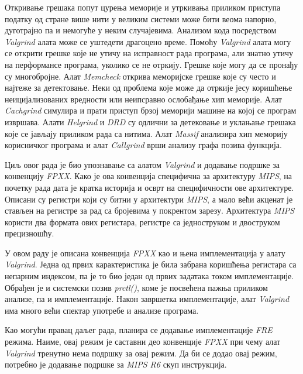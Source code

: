\documentclass[12pt,oneside]{memoir}
\begin{document}
\indent Откривање грешака попут цурења меморије и утркивања приликом приступа податку од стране више нити у великим системи може бити веома напорно, дуготрајно па и немогуће у неким случајевима. Анализом кода посредством \textit{Valgrind} алата може се уштедети драгоцено време. Помоћу \textit{Valgrind} алата могу се открити грешке које не утичу на исправност рада програма, али знатно утичу на перформансе програма, уколико се не отркију. Грешке које могу да се пронађу су многобројне. Алат \textit{Memcheck} открива меморијске грешке које су често и најтеже за детектовање. Неки од проблема које може да отркије јесу коришћење неицијализованих вредности или неипсравно ослобађање хип меморије. Алат \textit{Cachgrind} симулира и прати приступ брзој меморији машине на којој се програм  извршава. Алати \textit{Helgrind} и \textit{DRD} су одлични за детековање и уклањање грешака које се јављају приликом рада са нитима. Алат \textit{Massif} анализира хип меморију корисничког програма и алат \textit{Callgrind} врши анализу графа позива функција.

\indent Циљ овог рада је био упознавање са алатом \textit{Valgrind} и додавање подршке за конвенцију \textit{FPXX}. Како је ова конвенција специфична за архитектуру \textit{MIPS}, на почетку рада дата је кратка историја и осврт на специфичности ове архитектуре. Описани су регистри који су битни у архитектури \textit{MIPS}, а мало већи акценат је стављен на регистре за рад са бројевима у покрентом зарезу. Архитектура \textit{MIPS} користи два формата ових регистара, регистре са једноструком и двоструком прецизношћу.

\indent У овом раду је описана конвенција \textit{FPXX} као и њена имплементација у алату \textit{Valgrind}. Једна од првих карактеристика је била забрана коришћења регистара са непарним индексом, па је то био један од првих задатака током имплементације. Обрађен је и системски позив \textit{prctl()}, коме је посвећена пажња приликом анализе, па и имплементације. Након завршетка имплементације, алат \textit{Valgrind} има много већи спектар употребе и анализе програма.

\indent Као могући правац даљег рада, планира се додавање имплементације \textit{FRE} режима. Наиме, овај режим је саставни део конвенције \textit{FPXX} при чему алат \textit{Valgrind} тренутно нема подршку за овај режим. Да би се додао овај режим, потребно је додавање подршке за \textit{MIPS R6} скуп инструкција.



\literatura

\backmatter

\end{document}
